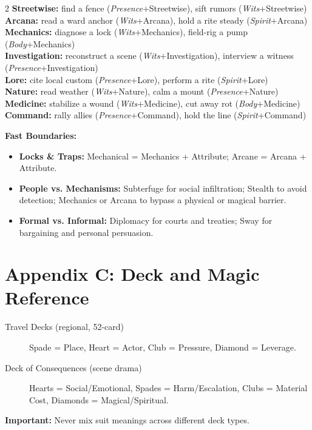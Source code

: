 \begin{tcolorbox}[title=Common Rolls (GM Screen Reference), colback=white!97!gray, colframe=black!80!gray,breakable]
\begin{multicols}{2}
\textbf{Streetwise:} find a fence (\emph{Presence}+Streetwise), sift rumors (\emph{Wits}+Streetwise)\\
\textbf{Arcana:} read a ward anchor (\emph{Wits}+Arcana), hold a rite steady (\emph{Spirit}+Arcana)\\
\textbf{Mechanics:} diagnose a lock (\emph{Wits}+Mechanics), field-rig a pump (\emph{Body}+Mechanics)\\
\textbf{Investigation:} reconstruct a scene (\emph{Wits}+Investigation), interview a witness (\emph{Presence}+Investigation)\\
\textbf{Lore:} cite local custom (\emph{Presence}+Lore), perform a rite (\emph{Spirit}+Lore)\\
\textbf{Nature:} read weather (\emph{Wits}+Nature), calm a mount (\emph{Presence}+Nature)\\
\textbf{Medicine:} stabilize a wound (\emph{Wits}+Medicine), cut away rot (\emph{Body}+Medicine)\\
\textbf{Command:} rally allies (\emph{Presence}+Command), hold the line (\emph{Spirit}+Command)
\end{multicols}
\vspace{0.5em}
\textbf{Fast Boundaries:}
\begin{itemize}
  \item \textbf{Locks \& Traps:} Mechanical = Mechanics + Attribute; Arcane = Arcana + Attribute.
  \item \textbf{People vs. Mechanisms:} Subterfuge for social infiltration; Stealth to avoid detection; Mechanics or Arcana to bypass a physical or magical barrier.
  \item \textbf{Formal vs. Informal:} Diplomacy for courts and treaties; Sway for bargaining and personal persuasion.
\end{itemize}
\end{tcolorbox}

\clearpage
\section*{Appendix C: Deck and Magic Reference}
\label{app:deck-magic}

\begin{tcolorbox}[title=Deck Types and Meanings, colback=white!97!gray, colframe=black!80!gray,breakable]
\begin{description}
  \item[Travel Decks (regional, 52-card)] Spade = Place, Heart = Actor, Club = Pressure, Diamond = Leverage.
  \item[Deck of Consequences (scene drama)] Hearts = Social/Emotional, Spades = Harm/Escalation, Clubs = Material Cost, Diamonds = Magical/Spiritual.
\end{description}
\textbf{Important:} Never mix suit meanings across different deck types.
\end{tcolorbox}

